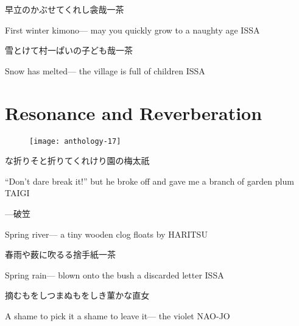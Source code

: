\begin{haiku}
    {\FH 早立のかぶせてくれし衾哉}\hfill{\FH 一茶}

    \vin{} First winter kimono---
    \vin{} \vin{} may you quickly grow to
    \vin{} \vin{} \vin{} a naughty age \hspace{\fill} ISSA
\end{haiku}

\begin{haiku}
    {\FH 雪とけて村一ぱいの子ども哉}\hfill{\FH 一茶}

    \vin{} Snow has melted---
    \vin{} \vin{} the village is full
    \vin{} \vin{} \vin{} of children \hspace{\fill} ISSA
\end{haiku}

\chapter{Resonance and Reverberation}

\begin{figure}
    \texttt{[image: anthology-17]}
\end{figure}

\begin{haiku}
    {\FH な折りそと折りてくれけり園の梅}\hfill{\FH 太祇}

    \vin{} ``Don't dare break it!''
    \vin{} \vin{} but he broke off and gave me
    \vin{} \vin{} \vin{} a branch of garden plum \hspace{\fill} TAIGI
\end{haiku}

\begin{haiku}
    {---}\hfill{\FH 破笠}

    \vin{} Spring river---
    \vin{} \vin{} a tiny wooden clog
    \vin{} \vin{} \vin{} floats by \hspace{\fill} HARITSU
\end{haiku}

\begin{haiku}
    {\FH 春雨や薮に吹るる捨手紙}\hfill{\FH 一茶}

    \vin{} Spring rain---
    \vin{} \vin{} blown onto the bush
    \vin{} \vin{} \vin{} a discarded letter \hspace{\fill} ISSA
\end{haiku}

\begin{haiku}
    {\FH 摘むもをしつまぬもをしき菫かな}\hfill{\FH 直女}

    \vin{} A shame to pick it
    \vin{} \vin{} a shame to leave it---
    \vin{} \vin{} \vin{} the violet \hspace{\fill} NAO-JO
\end{haiku}


